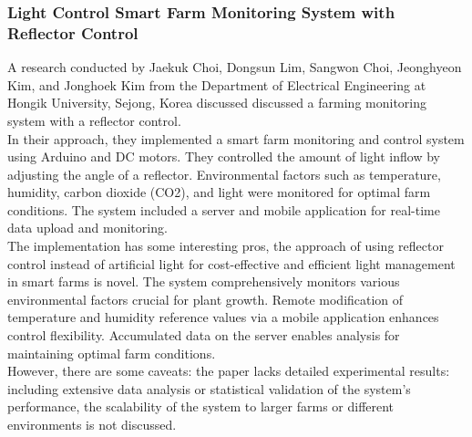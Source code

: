 \documentclass[12pt, a4paper]{article}
\begin{document}
\subsubsection{Light Control Smart Farm Monitoring System with Reflector Control}
A research conducted by Jaekuk Choi, Dongsun Lim, Sangwon Choi, Jeonghyeon Kim, and Jonghoek Kim \cite{choi2020light} from the Department of Electrical Engineering at Hongik University, Sejong, Korea discussed discussed a farming monitoring system with a reflector control.\\
In their approach, they implemented a smart farm monitoring and control system using Arduino and DC motors. They controlled the amount of light inflow by adjusting the angle of a reflector. Environmental factors such as temperature, humidity, carbon dioxide (CO2), and light were monitored for optimal farm conditions. The system included a server and mobile application for real-time data upload and monitoring.\\
The implementation has some interesting pros, the approach of using reflector control instead of artificial light for cost-effective and efficient light management in smart farms is novel.  The system comprehensively monitors various environmental factors crucial for plant growth. Remote modification of temperature and humidity reference values via a mobile application enhances control flexibility.
Accumulated data on the server enables analysis for maintaining optimal farm conditions.
\\
However, there are some caveats: the paper lacks detailed experimental results: including extensive data analysis or statistical validation of the system's performance, the scalability of the system to larger farms or different environments is not discussed.
\end{document}

